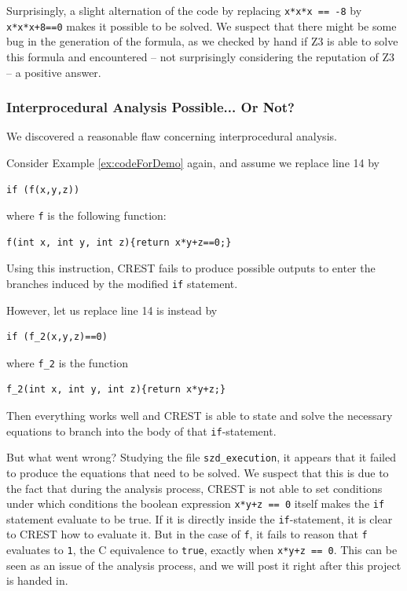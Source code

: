 \documentclass[oribibl]{llncs}
\begin{document}
Surprisingly, a slight alternation of the code by replacing \texttt{x*x*x == -8} by \texttt{x*x*x+8==0} makes it possible to be solved. We suspect that there might be some bug in the generation of the formula, as we checked by hand if \textsc{Z3} is able to solve this formula and encountered -- not surprisingly considering the reputation of \textsc{Z3} -- a positive answer.
\subsubsection{Interprocedural Analysis Possible... Or Not?}

We discovered a reasonable flaw concerning interprocedural analysis.

Consider Example \ref{ex:codeForDemo} again, and assume we replace
line 14 by
\begin{verbatim}
if (f(x,y,z))
\end{verbatim}
where \texttt{f} is the following function:
\begin{verbatim}
f(int x, int y, int z){return x*y+z==0;}
\end{verbatim}

Using this instruction, \textsc{CREST} fails to produce possible
outputs to enter the branches induced by the modified \texttt{if}
statement.

However, let us replace line 14 is instead by

\begin{verbatim}
if (f_2(x,y,z)==0)
\end{verbatim}

where \texttt{f\_2} is the function
\begin{verbatim}
f_2(int x, int y, int z){return x*y+z;}
\end{verbatim}

Then everything works well and \textsc{CREST} is able to state and
solve the necessary equations to branch into the body of that \texttt{if}-statement.

But what went wrong? Studying the file \texttt{szd\_execution}, it
appears that it failed to produce the equations that need to be
solved. We suspect that this is due to the fact that during the
analysis process, \textsc{CREST} is not able to set conditions under
which conditions the boolean expression \texttt{x*y+z == 0} itself makes the
\texttt{if} statement evaluate to be true. If it is directly inside
the \texttt{if}-statement, it is clear to \textsc{CREST} how to
evaluate it. But in the case of \texttt{f}, it fails to reason that
\texttt{f} evaluates to
\texttt{1}, the \textsc{C} equivalence to \texttt{true}, exactly when \texttt{x*y+z == 0}.
This can be seen as an issue of the analysis process, and we will post
it right after this project is handed in.
\end{document}

